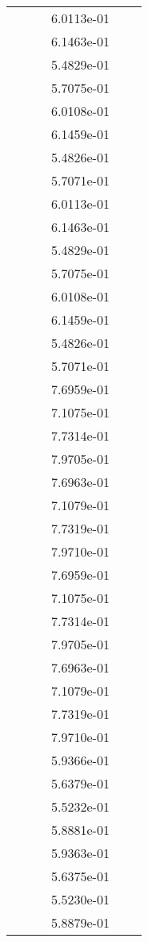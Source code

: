 \begin{xltabular}{\textwidth}{r|rS[table-format=1.3e+2]S[table-format=1.4e+2]S[table-format=1.4e+2]S[table-format=-1.5]}
&  &  & 6.0113e-01 & & \\
&  &  & 6.1463e-01 & & \\
&  &  & 5.4829e-01 & & \\
&  &  & 5.7075e-01 & & \\
&  &  & 6.0108e-01 & & \\
&  &  & 6.1459e-01 & & \\
&  &  & 5.4826e-01 & & \\
&  &  & 5.7071e-01 & & \\
&  &  & 6.0113e-01 & & \\
&  &  & 6.1463e-01 & & \\
&  &  & 5.4829e-01 & & \\
&  &  & 5.7075e-01 & & \\
&  &  & 6.0108e-01 & & \\
&  &  & 6.1459e-01 & & \\
&  &  & 5.4826e-01 & & \\
&  &  & 5.7071e-01 & & \\
&  &  & 7.6959e-01 & & \\
&  &  & 7.1075e-01 & & \\
&  &  & 7.7314e-01 & & \\
&  &  & 7.9705e-01 & & \\
&  &  & 7.6963e-01 & & \\
&  &  & 7.1079e-01 & & \\
&  &  & 7.7319e-01 & & \\
&  &  & 7.9710e-01 & & \\
&  &  & 7.6959e-01 & & \\
&  &  & 7.1075e-01 & & \\
&  &  & 7.7314e-01 & & \\
&  &  & 7.9705e-01 & & \\
&  &  & 7.6963e-01 & & \\
&  &  & 7.1079e-01 & & \\
&  &  & 7.7319e-01 & & \\
&  &  & 7.9710e-01 & & \\
&  &  & 5.9366e-01 & & \\
&  &  & 5.6379e-01 & & \\
&  &  & 5.5232e-01 & & \\
&  &  & 5.8881e-01 & & \\
&  &  & 5.9363e-01 & & \\
&  &  & 5.6375e-01 & & \\
&  &  & 5.5230e-01 & & \\
&  &  & 5.8879e-01 & & \\

\end{xltabular}
